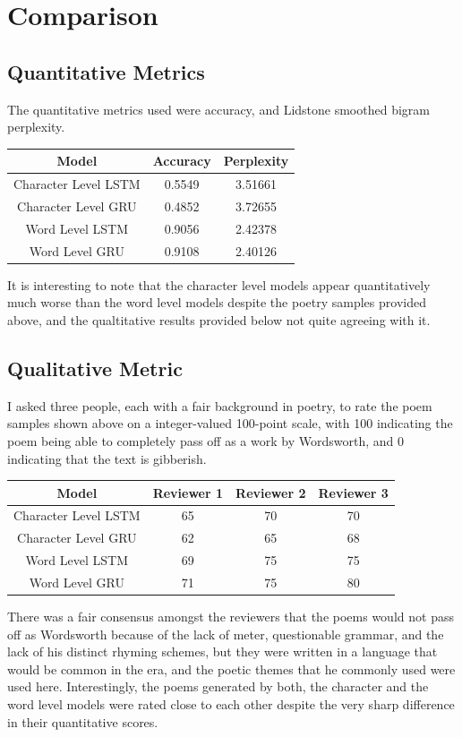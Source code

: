 \documentclass[15pt]{article}
\begin{document}
\section{Comparison}
\subsection*{Quantitative Metrics}
The quantitative metrics used were accuracy, and Lidstone smoothed bigram perplexity.
\begin{center}
 \begin{tabular}{||c c c||} 
 \hline
 Model & Accuracy & Perplexity \\ [0.5ex] 
 \hline\hline
 Character Level LSTM & 0.5549 & 3.51661 \\ 
 \hline
 Character Level GRU & 0.4852 & 3.72655 \\
 \hline
 Word Level LSTM & 0.9056 & 2.42378 \\
 \hline
 Word Level GRU & 0.9108 & 2.40126 \\ [1ex] 
 \hline
\end{tabular}
\end{center}

It is interesting to note that the character level models appear quantitatively much worse than the word level models despite the poetry samples provided above, and the qualtitative results provided below not quite agreeing with it. 

\subsection*{Qualitative Metric}
I asked three people, each with a fair background in poetry, to rate the poem samples shown above on a integer-valued 100-point scale, with 100 indicating the poem being able to completely pass off as a work by Wordsworth, and 0 indicating that the text is gibberish.

\begin{center}
 \begin{tabular}{||c c c c||} 
 \hline
 Model & Reviewer 1 & Reviewer 2 & Reviewer 3 \\ [0.5ex] 
 \hline\hline
 Character Level LSTM & 65 & 70 & 70 \\ 
 \hline
 Character Level GRU & 62 & 65 & 68\\
 \hline
 Word Level LSTM & 69 & 75 & 75 \\
 \hline
 Word Level GRU & 71 & 75 & 80 \\ [1ex] 
 \hline
 \end{tabular}
\end{center}
There was a fair consensus amongst the reviewers that the poems would not pass off as Wordsworth because of the lack of meter, questionable grammar, and  the lack of his distinct rhyming schemes, but they were written in a language that would be common in the era, and the poetic themes that he commonly used were used here. Interestingly, the poems generated by both, the character and the word level models were rated close to each other despite the very sharp difference in their quantitative scores.
\end{document}
